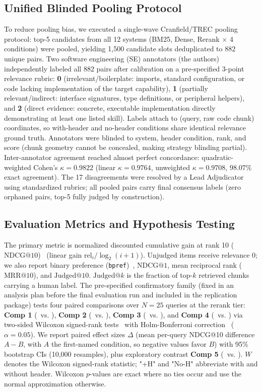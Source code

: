 \subsection{Unified Blinded Pooling Protocol}
\label{sec:approach:pooling}
To reduce pooling bias, we executed a single-wave Cranfield/TREC pooling protocol: top-5 candidates from all 12 systems (BM25, Dense, Rerank $\times$ 4 conditions) were pooled, yielding 1,500 candidate slots deduplicated to 882 unique pairs. 
Two software engineering (SE) annotators (the authors) independently labeled all 882 pairs after calibration on a pre-specified 3-point relevance rubric: \textbf{0} (irrelevant/boilerplate: imports, standard configuration, or code lacking implementation of the target capability), \textbf{1} (partially relevant/indirect: interface signatures, type definitions, or peripheral helpers), and \textbf{2} (direct evidence: concrete, executable implementation directly demonstrating at least one listed skill). Labels attach to (query, raw code chunk) coordinates, so with-header and no-header conditions share identical relevance ground truth. 
Annotators were blinded to system, header condition, rank, and score (chunk geometry cannot be concealed, making strategy blinding partial). 
Inter-annotator agreement reached almost perfect concordance: quadratic-weighted Cohen's $\kappa = 0.9822$ (linear $\kappa = 0.9764$, unweighted $\kappa = 0.9708$, $98.07\%$ exact agreement). 
The 17 disagreements were resolved by a Lead Adjudicator using standardized rubrics; all pooled pairs carry final consensus labels (zero orphaned pairs, top-5 fully judged by construction).

\subsection{Evaluation Metrics and Hypothesis Testing}
\label{sec:approach:metrics}
The primary metric is normalized discounted cumulative gain at rank 10 ($\text{NDCG@10}$)~\cite{jarvelin2002cumulated} (linear gain $\mathrm{rel}_i/\log_2(i+1)$). 
Unjudged items receive relevance 0; we also report binary preference (\texttt{bpref})~\cite{buckley2004bpref}, $\text{NDCG@1}$, mean reciprocal rank ($\text{MRR@10}$), and $\text{Judged@10}$. $\text{Judged@}k$ is the fraction of top-$k$ retrieved chunks carrying a human label. 
The pre-specified confirmatory family (fixed in an analysis plan before the final evaluation run and included in the replication package) tests four paired comparisons over $N=25$ queries at the rerank tier: \textbf{Comp 1} (\astH\ vs. \lineN), \textbf{Comp 2} (\astN\ vs. \lineN), \textbf{Comp 3} (\astH\ vs. \astN), and \textbf{Comp 4} (\lineH\ vs. \lineN) via two-sided Wilcoxon signed-rank tests~\cite{wilcoxon1945individual} with Holm-Bonferroni correction~\cite{holm1979simple} ($\alpha = 0.05$). 
We report paired effect sizes $\Delta$ (mean per-query NDCG@10 difference $A - B$, with $A$ the first-named condition, so negative values favor $B$) with 95\% bootstrap CIs (10,000 resamples), plus exploratory contrast \textbf{Comp 5} (\astH\ vs. \lineH). $W$ denotes the Wilcoxon signed-rank statistic; "+H" and "No-H" abbreviate with and without header. Wilcoxon $p$-values are exact where no ties occur and use the normal approximation otherwise.

